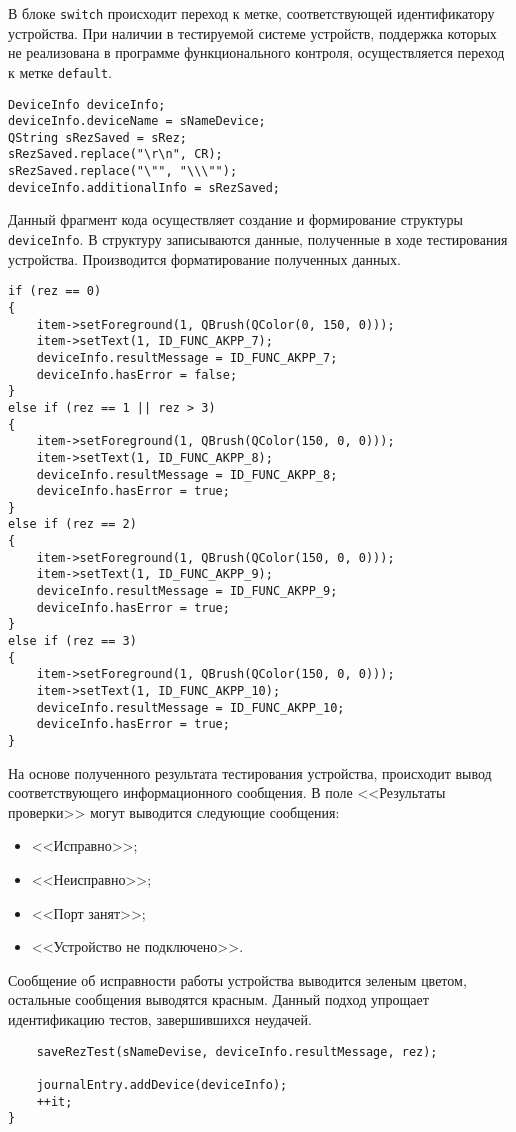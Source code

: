 В блоке \texttt{switch} происходит переход к метке, соответствующей идентификатору устройства. При наличии в тестируемой
системе устройств, поддержка которых не реализована в программе функционального контроля, осуществляется переход к метке
\texttt{default}.

\medskip
\begin{verbatim}
DeviceInfo deviceInfo;
deviceInfo.deviceName = sNameDevice;
QString sRezSaved = sRez;
sRezSaved.replace("\r\n", CR);
sRezSaved.replace("\"", "\\\"");
deviceInfo.additionalInfo = sRezSaved;
\end{verbatim}
\medskip

Данный фрагмент кода осуществляет создание и формирование структуры \texttt{deviceInfo}. В структуру записываются
данные, полученные в ходе тестирования устройства. Производится форматирование полученных данных.

\medskip
\begin{verbatim}
if (rez == 0)
{
	item->setForeground(1, QBrush(QColor(0, 150, 0)));
	item->setText(1, ID_FUNC_AKPP_7);
	deviceInfo.resultMessage = ID_FUNC_AKPP_7;
	deviceInfo.hasError = false;
}
else if (rez == 1 || rez > 3)
{
	item->setForeground(1, QBrush(QColor(150, 0, 0)));
	item->setText(1, ID_FUNC_AKPP_8);
	deviceInfo.resultMessage = ID_FUNC_AKPP_8;
	deviceInfo.hasError = true;
}
else if (rez == 2)
{
	item->setForeground(1, QBrush(QColor(150, 0, 0)));
	item->setText(1, ID_FUNC_AKPP_9);
	deviceInfo.resultMessage = ID_FUNC_AKPP_9;
	deviceInfo.hasError = true;
}
else if (rez == 3)
{
	item->setForeground(1, QBrush(QColor(150, 0, 0)));
	item->setText(1, ID_FUNC_AKPP_10);
	deviceInfo.resultMessage = ID_FUNC_AKPP_10;
	deviceInfo.hasError = true;
}
\end{verbatim}
\medskip

На основе полученного результата тестирования устройства, происходит вывод соответствующего информационного сообщения.
В поле <<Результаты проверки>> могут выводится следующие сообщения:
\begin{itemize}
	\item <<Исправно>>;
	\item <<Неисправно>>;
	\item <<Порт занят>>;
	\item <<Устройство не подключено>>.
\end{itemize}

Сообщение об исправности работы устройства выводится зеленым цветом, остальные сообщения выводятся красным. Данный
подход упрощает идентификацию тестов, завершившихся неудачей.
\medskip
\begin{verbatim}
	saveRezTest(sNameDevise, deviceInfo.resultMessage, rez);

	journalEntry.addDevice(deviceInfo);
	++it;
}
\end{verbatim}
\medskip

